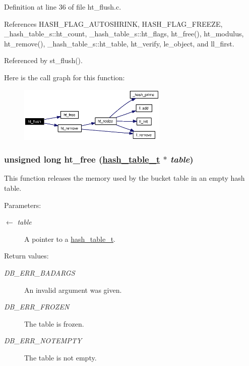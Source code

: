 Definition at line 36 of file ht\_\-flush.c.

References HASH\_\-FLAG\_\-AUTOSHRINK, HASH\_\-FLAG\_\-FREEZE, \_\-hash\_\-table\_\-s::ht\_\-count, \_\-hash\_\-table\_\-s::ht\_\-flags, ht\_\-free(), ht\_\-modulus, ht\_\-remove(), \_\-hash\_\-table\_\-s::ht\_\-table, ht\_\-verify, le\_\-object, and ll\_\-first.

Referenced by st\_\-flush().

Here is the call graph for this function:\begin{figure}[H]
\begin{center}
\leavevmode
\includegraphics[width=201pt]{group__dbprim__hash_ga16_cgraph}
\end{center}
\end{figure}
\hypertarget{group__dbprim__hash_ga18}{
\subsubsection[ht\_\-free]{\setlength{\rightskip}{0pt plus 5cm}unsigned long ht\_\-free (\hyperlink{struct__hash__table__s}{hash\_\-table\_\-t} $\ast$ {\em table})}}
\label{group__dbprim__hash_ga18}


This function releases the memory used by the bucket table in an empty hash table.

\begin{Desc}
\item[Parameters:]
\begin{description}
\item[\mbox{$\leftarrow$} {\em table}]A pointer to a \hyperlink{group__dbprim__hash_ga1}{hash\_\-table\_\-t}.\end{description}
\end{Desc}
\begin{Desc}
\item[Return values:]
\begin{description}
\item[{\em DB\_\-ERR\_\-BADARGS}]An invalid argument was given. \item[{\em DB\_\-ERR\_\-FROZEN}]The table is frozen. \item[{\em DB\_\-ERR\_\-NOTEMPTY}]The table is not empty.\end{description}
\end{Desc}



